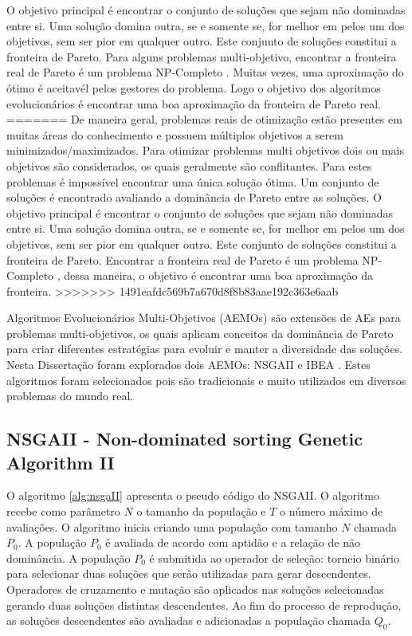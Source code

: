 O objetivo principal é encontrar o conjunto  
de soluções que sejam não dominadas entre si. Uma solução domina outra, se e somente se, for melhor em pelos um dos objetivos, sem ser pior em qualquer outro.
Este conjunto de soluções constitui a fronteira de Pareto. Para alguns problemas multi-objetivo, encontrar a fronteira real de Pareto é um problema NP-Completo \cite{fonseca2005tutorial}. Muitas vezes, uma aproximação do ótimo é aceitavél pelos gestores do problema. Logo o objetivo dos algoritmos evolucionários é encontrar uma boa aproximação da fronteira de Pareto real.
=======
De maneira geral, problemas reais de otimização  estão presentes em muitas áreas do conhecimento e possuem múltiplos objetivos a serem minimizados/maximizados. Para otimizar problemas multi objetivos dois ou mais objetivos são considerados, os quais geralmente são conflitantes. Para estes problemas é impossível encontrar uma
única solução ótima. Um conjunto de soluções é encontrado avaliando a dominância de Pareto \cite{pareto} entre as soluções. O objetivo principal é encontrar o conjunto  
de soluções que sejam não dominadas entre si. Uma solução domina outra, se e somente se, for melhor em pelos um dos objetivos, sem ser pior em qualquer outro.
Este conjunto de soluções constitui a fronteira de Pareto. Encontrar a fronteira real de Pareto é um problema NP-Completo \cite{fonseca2005tutorial}, dessa maneira,
o objetivo é encontrar uma boa aproximação da fronteira.
>>>>>>> 1491eafdc569b7a670d8f8b83aae192c363e6aab

Algoritmos Evolucionários Multi-Objetivos (AEMOs) são extensões de AEs para problemas multi-objetivos, os quais aplicam
conceitos da dominância de Pareto para criar diferentes estratégias para evoluir e manter a diversidade das soluções.
Nesta Dissertação foram explorados dois AEMOs: NSGAII \cite{deb2002fast} e IBEA \cite{zitzler2004indicator}. Estes algoritmos foram selecionados pois são tradicionais e muito utilizados em diversos problemas do mundo real.

\subsection{NSGAII - Non-dominated sorting Genetic Algorithm II}
\label{subsection:nsgaii}

O algoritmo \ref{alg:nsgaII} apresenta o pseudo código do NSGAII. O algoritmo recebe como parâmetro $N$ o tamanho da população e $T$ o número máximo 
de avaliações. O algoritmo inicia criando uma população com tamanho $N$ chamada $P_0$. A população $P_0$ é avaliada de acordo com aptidão 
e a relação de não dominância. A população $P_0$ é submitida ao operador de seleção: torneio binário para selecionar duas soluções que serão utilizadas
para gerar descendentes. Operadores de cruzamento e mutação são aplicados nas soluções selecionadas gerando duas soluções distintas descendentes. 
Ao fim do processo de reprodução, as soluções descendentes são avaliadas e adicionadas a população chamada $Q_0$.

